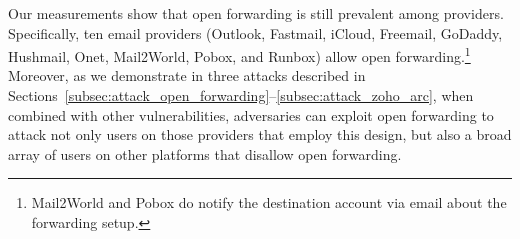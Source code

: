 


Our measurements show that open forwarding is still prevalent among providers.
Specifically, ten email providers (Outlook, Fastmail, iCloud, Freemail, GoDaddy, Hushmail,
Onet, Mail2World, Pobox, and Runbox) allow open
forwarding.\footnote{Mail2World and Pobox do notify the destination account
via email about the forwarding setup.}  Moreover, as we demonstrate in three
attacks described in
Sections~\ref{subsec:attack_open_forwarding}--\ref{subsec:attack_zoho_arc},
when combined with other vulnerabilities, adversaries can exploit open
forwarding to attack not only users on those providers that employ
this design, but also a broad array of users on other platforms that
disallow open forwarding.




